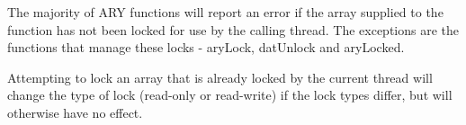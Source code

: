 \documentclass[twoside,11pt,nolof]{starlink}
\begin{document}
{{{         \sstitem
          The majority of ARY functions will report an error if the array
         supplied to the function has not been locked for use by the calling
         thread. The exceptions are the functions that manage these locks -
         aryLock, datUnlock and aryLocked.

         \sstitem
          Attempting to lock an array that is already locked by the
         current thread will change the type of lock (read-only or
         read-write) if the lock types differ, but will otherwise have no
         effect.
      }
   }
}
\newpage
\end{document}
